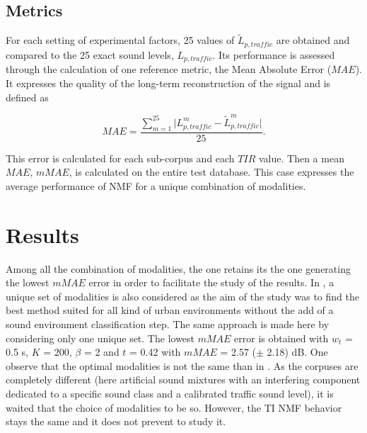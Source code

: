 \documentclass[12pt,english,twoside]{article}
\begin{document}
\subsection{Metrics}
For each setting of experimental factors, 25 values of $\tilde{L}_{p,traffic}$ are obtained and compared to the 25 exact sound levels, $L_{p,traffic}$. Its performance is assessed through the calculation of one reference metric, the Mean Absolute Error ($MAE$). It expresses the quality of the long-term reconstruction of the signal and is defined as

\begin{equation}
MAE = \frac{\sum_{m = 1}^{25}\vert L^m_{p,traffic}-\tilde{L}^m_{p,traffic} \vert}{25}.
\end{equation}

This error is calculated for each sub-corpus and each $TIR$ value. Then a mean $MAE$, $mMAE$, is calculated on the entire test database. This case expresses the average performance of NMF for a unique combination of modalities.

\section{Results}\label{part:results}

Among all the combination of modalities, the one retains its the one generating the lowest $mMAE$ error in order to facilitate the study of the results. 
In \cite{gloaguen2019road}, a unique set of modalities is also considered as the aim of the study was to find the best method suited for all kind of urban environments without the add of a sound environment classification step. The same approach is made here by considering only one unique set. The lowest $mMAE$ error is obtained with $w_t$ = 0.5 s, $K$ = 200, $\beta$ = 2 and $t$ = 0.42 with $mMAE$ = 2.57 ($\pm$ 2.18) dB. 
One observe that the optimal modalities is not the same than in \cite{gloaguen2019road}. As the corpuses are completely different (here artificial sound mixtures with an interfering component dedicated to a specific sound class and a calibrated traffic sound level), it is waited that the choice of modalities to be so. However, the TI NMF behavior stays the same and it does not prevent to study it.
\end{document}

